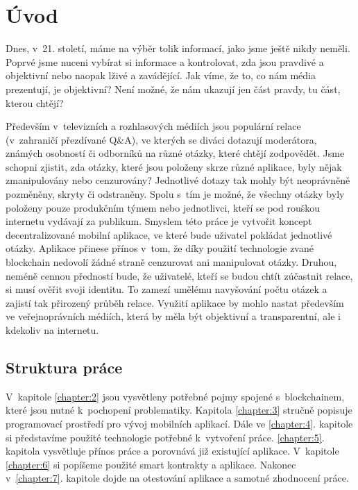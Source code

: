 
%
\chapter{Úvod}
\label{chapter:1}
Dnes, v~21. století, máme na výběr tolik informací, jako jsme ještě nikdy neměli. Poprvé jsme nuceni vybírat si informace a kontrolovat, zda jsou pravdivé a objektivní nebo naopak lživé a zavádějící. Jak víme, že to, co nám média prezentují, je objektivní? Není možné, že nám ukazují jen část pravdy, tu část, kterou chtějí?

Především v~televizních a rozhlasových médiích jsou populární relace (v~zahraničí přezdívané Q\&A), ve kterých se diváci dotazují moderátora, známých osobností či odborníků na různé otázky, které chtějí zodpovědět. Jsme schopni zjistit, zda otázky, které jsou položeny skrze různé aplikace, byly nějak zmanipulovány nebo cenzurovány? Jednotlivé dotazy tak mohly být neoprávněně pozměněny, skryty či odstraněny. Spolu s~tím je možné, že všechny otázky byly položeny pouze produkčním týmem nebo jednotlivci, kteří se pod rouškou internetu vydávají za  publikum.
Smyslem této práce je vytvořit koncept decentralizované mobilní aplikace, ve které bude uživatel pokládat jednotlivé otázky. Aplikace přinese přínos v~tom, že díky použití technologie zvané blockchain nedovolí žádné straně cenzurovat ani manipulovat otázky. Druhou, neméně cennou předností bude, že uživatelé, kteří se budou chtít zúčastnit relace, si musí ověřit svoji identitu. To zamezí umělému navyšování počtu otázek a zajistí tak přirozený průběh relace. Využití aplikace by mohlo nastat především ve veřejnoprávních médiích, která by měla být objektivní a transparentní, ale i kdekoliv na internetu. \\
\section{Struktura práce }
V~kapitole \ref{chapter:2} jsou vysvětleny potřebné pojmy spojené s~blockchainem, které jsou nutné k~pochopení problematiky. Kapitola \ref{chapter:3} stručně popisuje programovací prostředí pro vývoj mobilních aplikací. Dále ve \ref{chapter:4}. kapitole si představíme použité technologie potřebné k~vytvoření práce. \ref{chapter:5}. kapitola vysvětluje přínos práce a porovnává již existující aplikace. V~kapitole \ref{chapter:6} si popíšeme použité smart kontrakty a aplikace. Nakonec v~\ref{chapter:7}. kapitole dojde na otestování aplikace a samotné zhodnocení práce. 
